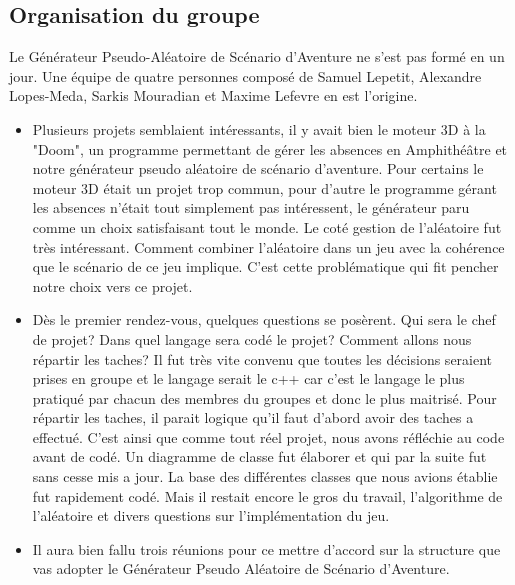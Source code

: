 \subsection{Organisation du groupe}
Le Générateur Pseudo-Aléatoire de Scénario d'Aventure ne s'est pas formé en un jour.
Une équipe de quatre personnes composé de Samuel Lepetit, Alexandre Lopes-Meda, Sarkis Mouradian et Maxime Lefevre en est l'origine.

\begin{itemize}

\item Plusieurs projets semblaient intéressants, il y avait bien le moteur 3D à la "Doom", un programme permettant de gérer les absences en Amphithéâtre
 et notre générateur pseudo aléatoire de scénario d'aventure.
 Pour certains le moteur 3D était un projet trop commun, pour d'autre le programme gérant les absences n'était tout simplement pas intéressent, le générateur paru comme un choix satisfaisant tout le monde.
Le coté gestion de l'aléatoire fut très intéressant. Comment combiner l'aléatoire dans un jeu avec la cohérence que le scénario de ce jeu implique. C'est cette problématique qui fit pencher notre choix vers ce projet.


\item Dès le premier rendez-vous, quelques questions se posèrent.
Qui sera le chef de projet? Dans quel langage sera codé le projet? Comment allons nous répartir les taches?
Il fut très vite convenu  que toutes les décisions seraient prises en groupe et le langage serait le c++ car c'est le langage le plus pratiqué par chacun des membres du groupes et donc le plus maitrisé. Pour répartir les taches, il parait logique qu'il faut d'abord avoir des taches a effectué. C'est ainsi que comme tout réel projet, nous avons réfléchie au code avant de codé. Un diagramme de classe fut élaborer et qui par la suite fut sans cesse mis a jour.
La base des différentes classes que nous avions établie fut rapidement codé. Mais il restait encore le gros du travail, l'algorithme de l'aléatoire et divers questions sur l'implémentation du jeu.


\item Il aura bien fallu trois réunions pour ce mettre d'accord sur la structure que vas adopter le Générateur Pseudo Aléatoire de Scénario d'Aventure.



\end{itemize}
